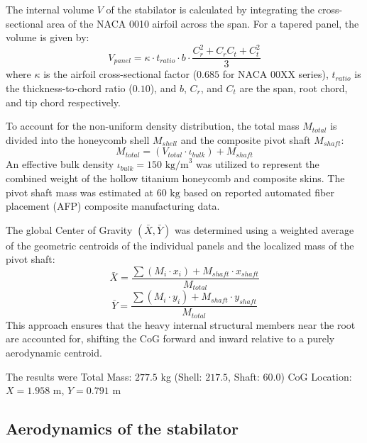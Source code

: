 \documentclass[
bindingoffset=5mm,  %
footnoteindent=3mm, %
hyphenation=true    %
]{src/wut-thesis}
\begin{document}
	The internal volume $V$ of the stabilator is calculated by integrating the cross-sectional area of the NACA 0010 airfoil across the span. For a tapered panel, the volume is given by:
	\begin{equation}
		V_{panel} = \kappa \cdot t_{ratio} \cdot b \cdot \frac{C_r^2 + C_r C_t + C_t^2}{3}
	\end{equation}
	where $\kappa$ is the airfoil cross-sectional factor ($0.685$ for NACA 00XX series), $t_{ratio}$ is the thickness-to-chord ratio ($0.10$), and $b$, $C_r$, and $C_t$ are the span, root chord, and tip chord respectively.
	
	To account for the non-uniform density distribution, the total mass $M_{total}$ is divided into the honeycomb shell $M_{shell}$ and the composite pivot shaft $M_{shaft}$:
	\begin{equation}
		M_{total} = (V_{total} \cdot \iota_{bulk}) + M_{shaft}
	\end{equation}
	An effective bulk density $\iota_{bulk} = 150 \text{ kg/m}^3$ was utilized to represent the combined weight of the hollow titanium honeycomb and composite skins. The pivot shaft mass was estimated at $60 \text{ kg}$ based on reported automated fiber placement (AFP) composite manufacturing data.
	
	The global Center of Gravity $(\bar{X}, \bar{Y})$ was determined using a weighted average of the geometric centroids of the individual panels and the localized mass of the pivot shaft:
	\begin{equation}
		\bar{X} = \frac{\sum (M_i \cdot x_i) + M_{shaft} \cdot x_{shaft}}{M_{total}}
	\end{equation}
	\begin{equation}
		\bar{Y} = \frac{\sum (M_i \cdot y_i) + M_{shaft} \cdot y_{shaft}}{M_{total}}
	\end{equation}
	This approach ensures that the heavy internal structural members near the root are accounted for, shifting the CoG forward and inward relative to a purely aerodynamic centroid.
	
	The results were Total Mass:      $277.5$ kg (Shell: $217.5$, Shaft: $60.0$)
	CoG Location:    $X = 1.958$ m, $Y = 0.791$ m
	
	\subsection{Aerodynamics of the stabilator}
	
\end{document}
